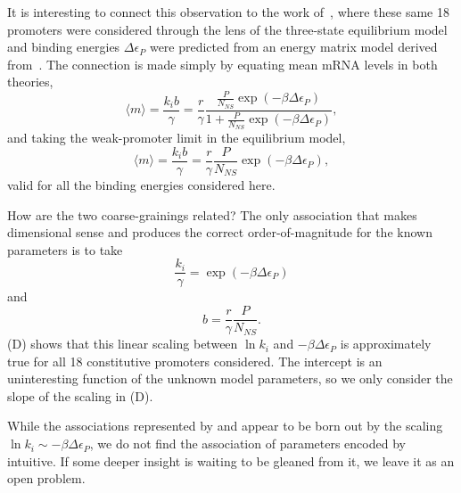 It is interesting to connect this observation to the work
of~\cite{Brewster2012}, where these same 18 promoters were
considered through the lens of the three-state equilibrium model
and binding energies $\Delta\epsilon_P$ were predicted from an
energy matrix model derived from~\cite{Kinney2010}. The connection
is made simply by equating mean mRNA levels in both theories,
\begin{equation}
\langle m \rangle = \frac{k_i b}{\gamma}
        = \frac{r}{\gamma}
        \frac{\frac{P}{N_{NS}}\exp(-\beta\Delta\epsilon_P)}
                {1+\frac{P}{N_{NS}}\exp(-\beta\Delta\epsilon_P)},
\end{equation}
and taking the weak-promoter limit in the equilibrium model,
\begin{equation}
\langle m \rangle = \frac{k_i b}{\gamma}
        = \frac{r}{\gamma} \frac{P}{N_{NS}}\exp(-\beta\Delta\epsilon_P),
\end{equation}
valid for all the binding energies considered here.

How are the two coarse-grainings related? The only association that makes dimensional sense and produces the correct order-of-magnitude for the known parameters is to take
\begin{equation}
\frac{k_i}{\gamma} = \exp(-\beta\Delta\epsilon_P)
\label{eq:bursty_equil_corresp1}
\end{equation}
and
\begin{equation}
b = \frac{r}{\gamma}\frac{P}{N_{NS}}.
\label{eq:bursty_equil_corresp2}
\end{equation}
(D) shows that this linear scaling
between $\ln k_i$ and $-\beta\Delta\epsilon_P$ is approximately
true for all 18 constitutive promoters considered. The intercept
is an uninteresting function of the unknown model parameters, so
we only consider the slope of the scaling in
(D).

While the associations represented by
 and 
appear to be born out by the scaling $\ln k_i \sim
-\beta\Delta\epsilon_P$, we do not find the association of
parameters encoded by
intuitive. If some deeper insight is waiting to be gleaned from it,
we leave it as an open problem.

